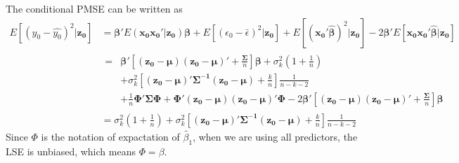 \documentclass[11pt]{article}
\begin{document}
The conditional PMSE can be written as
$$\begin{aligned}
E[(y_0-\hat{y_0})^2|\boldsymbol{z_0}]
&=\boldsymbol{\beta'}E(\boldsymbol{x_0x_0'}|\boldsymbol{z_0})\boldsymbol{\beta}+E[(\epsilon_0-\bar{\epsilon})^2|\boldsymbol{z_0}]+E[(\boldsymbol{x_0'\hat{\beta}})^2|\boldsymbol{z_0}]-2\boldsymbol{\beta'}E[\boldsymbol{x_0x_0'\hat{\beta}}|\boldsymbol{z_0}]\\
&\begin{aligned}=&\boldsymbol{\beta}' \left[\boldsymbol{(z_0-\mu)(z_0-\mu)'}+\frac{\boldsymbol{\Sigma}}{n} \right]\boldsymbol{\beta}+\sigma_k^2 \left(1+\frac{1}{n}\right)\\
&+\sigma_{k}^2 \left[\boldsymbol{(z_0-\mu)'\Sigma^{-1}(z_0-\mu)}+\frac{k}{n} \right]\frac{1}{n-k-2}\\
&+\frac{1}{n}\boldsymbol{\Phi'\Sigma\Phi}+\boldsymbol{\Phi'(z_{0}-\mu)(z_{0}-\mu)'\Phi}-2\boldsymbol{\beta'}\left[\boldsymbol{(z_0-\mu)(z_0-\mu)'}+\frac{\boldsymbol{\Sigma}}{n} \right]\boldsymbol{\beta}
\end{aligned}\\
&=\sigma_k^2\left(1+\frac{1}{n}\right)+\sigma_k^2 \left[\boldsymbol{(z_0-\mu)'\Sigma^{-1}(z_0-\mu)}+\frac{k}{n} \right]\frac{1}{n-k-2}
\end{aligned}$$
Since $\Phi$ is the notation of expactation of $\tilde{\beta_1}$, when we are using all predictors, the LSE is unbiased, which means $\Phi = \beta$. 
\end{document}
